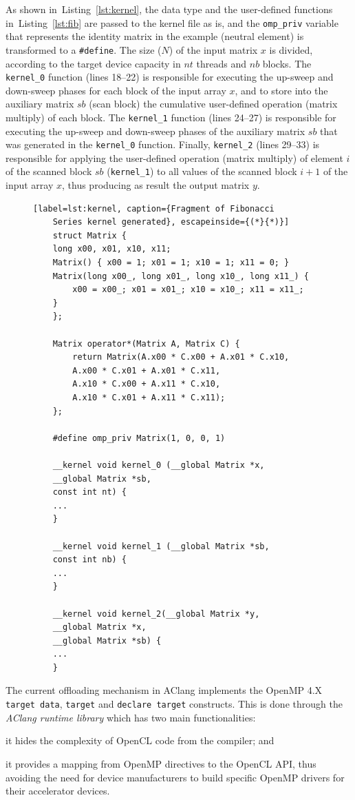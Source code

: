 \documentclass[Ingles]{ic-tese-v1}
\newcommand{\ttt}[1]{{\texttt{#1}}}
\newcommand{\rlst}[1]{Listing~\ref{lst:#1}}
\begin{document}
As  shown in~\rlst{kernel},  the  data  type  and  the
user-defined functions  in~\rlst{fib} are passed to  the kernel file
as is, and the \ttt{omp\_priv} variable that represents the identity
matrix  in  the   example  (neutral  element)  is   transformed  to  a
\ttt{\#define}.  The size ($N$) of  the input matrix $x$ is divided,
according to the target device  capacity in $nt$ threads and $nb$
blocks.  The \ttt{kernel\_0} function  (lines 18--22) is responsible
for executing the  up-sweep and down-sweep phases for  each block of
the input array $x$, and to store into the auxiliary matrix $sb$ (scan
block) the  cumulative user-defined  operation (matrix  multiply) of
each  block.    The  \ttt{kernel\_1}  function  (lines   24--27)  is
responsible for executing the up-sweep  and down-sweep phases of the
auxiliary matrix  $sb$  that was generated  in  the  \ttt{kernel\_0}
function.   Finally, \ttt{kernel\_2}  (lines 29--33)  is responsible
for applying the user-defined operation (matrix multiply) of element
$i$ of  the scanned block  $sb$ (\ttt{kernel\_1}) to  all values  of the
scanned block $i+1$  of the input array $x$, thus  producing  as result the
output matrix $y$.


\begin{figure}[t]
	\lstset{basicstyle=\scriptsize}
	\begin{lstlisting}[label=lst:kernel, caption={Fragment of Fibonacci
	Series kernel generated}, escapeinside={(*}{*)}]
	struct Matrix {
	long x00, x01, x10, x11;
	Matrix() { x00 = 1; x01 = 1; x10 = 1; x11 = 0; }
	Matrix(long x00_, long x01_, long x10_, long x11_) {
		x00 = x00_; x01 = x01_; x10 = x10_; x11 = x11_;
	}
	};
	
	Matrix operator*(Matrix A, Matrix C) {
		return Matrix(A.x00 * C.x00 + A.x01 * C.x10,
		A.x00 * C.x01 + A.x01 * C.x11,
		A.x10 * C.x00 + A.x11 * C.x10,
		A.x10 * C.x01 + A.x11 * C.x11);
	};
	
	#define omp_priv Matrix(1, 0, 0, 1)
	
	__kernel void kernel_0 (__global Matrix *x,
	__global Matrix *sb,
	const int nt) {
	...
	}
	
	__kernel void kernel_1 (__global Matrix *sb,
	const int nb) {
	...
	}
	
	__kernel void kernel_2(__global Matrix *y,
	__global Matrix *x,
	__global Matrix *sb) {
	...
	}
	\end{lstlisting}
\end{figure}

The current offloading  mechanism in AClang implements  the OpenMP 4.X
\ttt{target data},  \ttt{target} and \ttt{declare  target} constructs. This is 
done through the \textit{AClang runtime library} which  has two main functionalities:
\begin{inparaenum}[(i)\upshape]
	\item it hides the complexity of OpenCL code from the compiler; and
	\item it provides a mapping from  OpenMP directives to the OpenCL API,
	thus avoiding  the need for  device manufacturers to  build specific
	OpenMP drivers for their accelerator devices.
\end{inparaenum}
\end{document}
